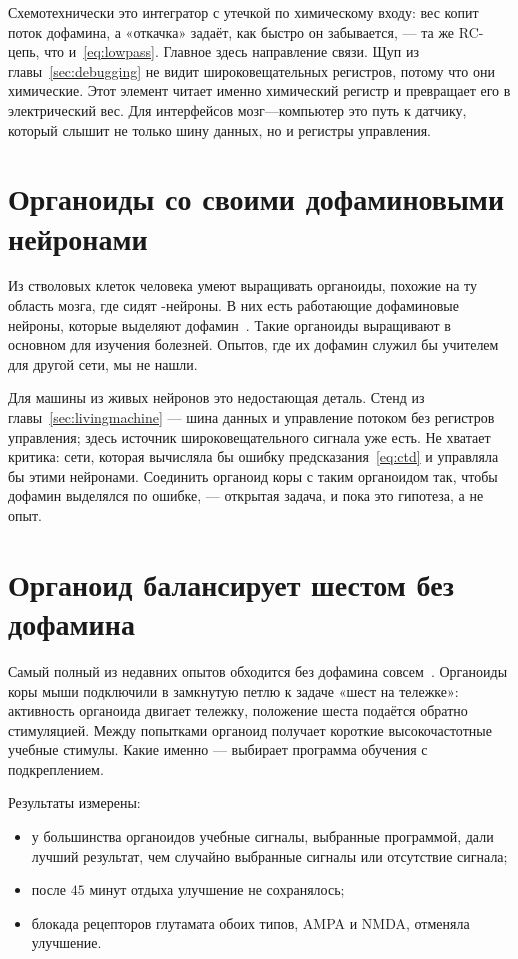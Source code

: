 Схемотехнически это интегратор с утечкой по химическому входу: вес копит поток дофамина, а «откачка» задаёт, как быстро он забывается, --- та же RC-цепь, что и~\eqref{eq:lowpass}. Главное здесь направление связи. Щуп из главы~\ref{sec:debugging} не видит широковещательных регистров, потому что они химические. Этот элемент читает именно химический регистр и превращает его в электрический вес. Для интерфейсов мозг---компьютер это путь к датчику, который слышит не только шину данных, но и регистры управления.

\section{Органоиды со своими дофаминовыми нейронами}
\label{sec:midbrainorg}

Из стволовых клеток человека умеют выращивать органоиды, похожие на ту область мозга, где сидят -нейроны. В них есть работающие дофаминовые нейроны, которые выделяют дофамин~\cite{Jo2016}. Такие органоиды выращивают в основном для изучения болезней. Опытов, где их дофамин служил бы учителем для другой сети, мы не нашли.

Для машины из живых нейронов это недостающая деталь. Стенд из главы~\ref{sec:livingmachine} --- шина данных и управление потоком без регистров управления; здесь источник широковещательного сигнала уже есть. Не хватает критика: сети, которая вычисляла бы ошибку предсказания~\eqref{eq:ctd} и управляла бы этими нейронами. Соединить органоид коры с таким органоидом так, чтобы дофамин выделялся по ошибке, --- открытая задача, и пока это гипотеза, а не опыт.

\section{Органоид балансирует шестом без дофамина}
\label{sec:cartpole}

Самый полный из недавних опытов обходится без дофамина совсем~\cite{Robbins2026}. Органоиды коры мыши подключили в замкнутую петлю к задаче «шест на тележке»: активность органоида двигает тележку, положение шеста подаётся обратно стимуляцией. Между попытками органоид получает короткие высокочастотные учебные стимулы. Какие именно --- выбирает программа обучения с подкреплением.

Результаты измерены:
\begin{itemize}
\item у большинства органоидов учебные сигналы, выбранные программой, дали лучший результат, чем случайно выбранные сигналы или отсутствие сигнала;
\item после $45$ минут отдыха улучшение не сохранялось;
\item блокада рецепторов глутамата обоих типов, AMPA и NMDA, отменяла улучшение.
\end{itemize}

